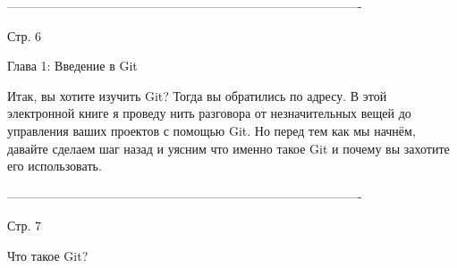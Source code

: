 -------------------------------------------------------------------------------------

Стр. 6

Глава 1: Введение в Git

Итак, вы хотите изучить Git? Тогда вы обратились по адресу. В этой электронной книге
я проведу нить разговора от незначительных вещей до управления ваших проектов с
помощью Git. Но перед тем как мы начнём, давайте сделаем шаг назад и уясним что
именно такое Git и почему вы захотите его использовать.

-------------------------------------------------------------------------------------

Стр. 7

Что такое Git?

